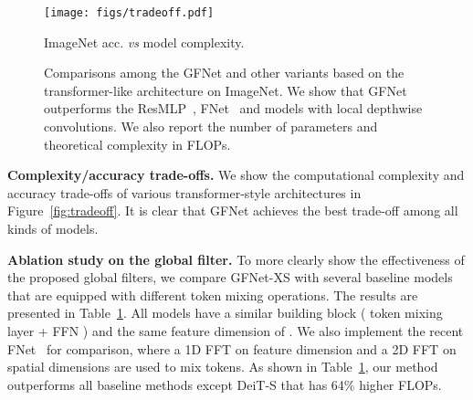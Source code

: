 \documentclass{article}
\numberwithin{equation}{section}
\newcommand{\gknet}{GFNet}
\newcommand{\paragrapha}[2][1pt]{\vspace{#1}\noindent\textbf{#2}}
\begin{document}
\begin{figure}[t]
\centering
\begin{minipage}{0.48\textwidth}
\centering
\texttt{[image: figs/tradeoff.pdf]} \vspace{-5pt}
\caption{\small ImageNet acc.  \emph{vs} model complexity.}\label{fig:tradeoff}
\end{minipage}\hfill
\begin{minipage}{0.48\textwidth}
\centering
\captionsetup{type=table} \centering
\caption{\small Comparisons among the \gknet{} and other variants based on the transformer-like architecture on ImageNet. We show that \gknet{} outperforms the ResMLP~\cite{touvron2021resmlp}, FNet~\cite{lee2021fnet} and models with local depthwise convolutions. We also report the number of parameters and theoretical complexity in FLOPs. } \vspace{5pt}
\label{tab:ablation}
\end{minipage} \vspace{-10pt}
\end{figure}

\paragrapha{Complexity/accuracy trade-offs.} We show the computational complexity and accuracy trade-offs of various transformer-style architectures in Figure~\ref{fig:tradeoff}. It is clear that GFNet achieves the best trade-off among all kinds of models.

\paragrapha{Ablation study on the global filter.} To more clearly show the effectiveness of the proposed global filters, we compare GFNet-XS with several baseline models that are equipped with different token mixing operations. The results are presented in Table~\ref{tab:ablation}. All models have a similar building block ( token mixing layer + FFN ) and the same feature dimension of . We also implement the recent FNet~\cite{lee2021fnet} for comparison, where a 1D FFT on feature dimension and a 2D FFT on spatial dimensions are used to mix tokens. As shown in Table~\ref{tab:ablation}, our method outperforms all baseline methods except DeiT-S that has 64\% higher FLOPs.  
\end{document}
